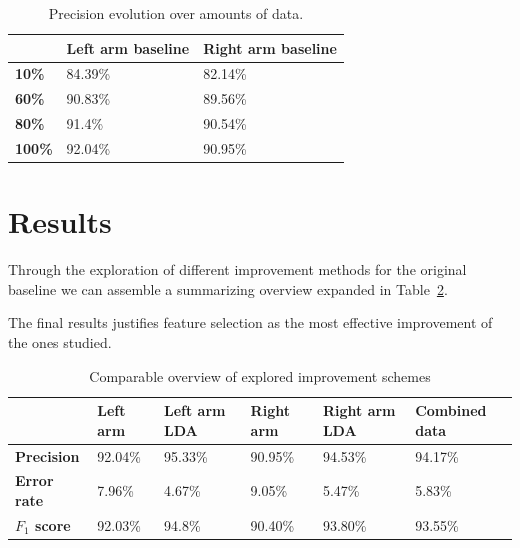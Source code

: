 \documentclass{sig-alternate}
\begin{document}
\begin{table}[t]
\centering
\caption{Precision evolution over amounts of data.}
\begin{tabular}{|l|l|l|}
\hline
           					&\textbf{Left arm baseline} 	&\textbf{Right arm baseline}		\\ \hline
\textbf{10\%}  				& 84.39\% 		 				& 82.14\%							\\ \hline
\textbf{60\%} 				& 90.83\%		 				& 89.56\%							\\ \hline
\textbf{80\%}  				& 91.4\%		 				& 90.54\%							\\ \hline
\textbf{100\%}  			& 92.04\% 		 				& 90.95\%							\\ \hline

\end{tabular}
\label{tab:evo_prec}
\end{table}


\section{Results}
Through the exploration of different improvement methods for the original baseline we can assemble a summarizing overview expanded in Table~\ref{tab:results}.

The final results justifies feature selection as the most effective improvement of the ones studied.

\begin{table}[t]
\centering
\caption{Comparable overview of explored improvement schemes}
\begin{tabular}{|l|l|l|l|l|l|}
\hline
           							&\textbf{Left arm} 			&\textbf{Left arm LDA}		&\textbf{Right arm}		&\textbf{Right arm LDA}		&\textbf{Combined data}	\\ \hline
\textbf{Precision}  				& 92.04\% 		 			& 95.33\%					& 90.95\%				& 94.53\%					& 94.17\%				\\ \hline
\textbf{Error rate} 				& 7.96\%		 			& 4.67\%					& 9.05\%				& 5.47\%					& 5.83\%				\\ \hline
\textbf{$F_{1}$ score}  			& 92.03\%		 			& 94.8\%					& 90.40\%				& 93.80\%					& 93.55\%				\\ \hline

\end{tabular}
\label{tab:results}
\end{table}

\end{document}
